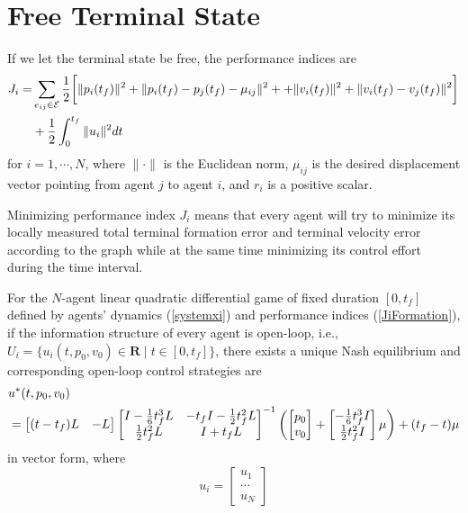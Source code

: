 \documentclass[12pt,draftcls,onecolumn]{IEEEtran}  %
\begin{document}
\section{Free Terminal State}
If we let the terminal state be free, the performance indices are
\begin{align}
J_i=&\sum_{e_{ij}\in\mathcal{E}} \frac{1}{2}\bigg[\|p_i(t_f)\|^2+\|p_i(t_f)-p_j(t_f)-\mu_{ij}\|^2+ +\|v_i(t_f)\|^2+\|v_i(t_f)-v_j(t_f)\|^2\bigg]\notag\\
&+\frac{1}{2}\int^{t_f}_0 \|u_i\|^2  \mbox{d}t\label{JiFormation}
\end{align}
for $i=1,\cdots,N$, where $\|\cdot\|$ is the Euclidean norm, $\mu_{ij}$ is the desired displacement vector pointing from {agent} $j$ to {agent} $i$, and $r_i$ is a positive scalar. {Minimizing performance index $J_i$ means that every agent will try to minimize its locally measured total terminal formation error and terminal velocity error according to the graph while at the same time minimizing its control effort during the time interval.
\begin{thm}
For the $N$-agent linear quadratic differential game of fixed duration $[0,t_f]$ defined by agents' dynamics (\ref{systemxi}) and performance indices (\ref{JiFormation}), if the information structure of every agent is open-loop, i.e., $U_i=\{u_i(t,p_0,v_0)\in \mathbf{R} \mid t\in[0,t_f]\}$, there exists a unique Nash equilibrium and corresponding open-loop control strategies are
\begin{align}
&u^*(t,p_0,v_0)\notag\\
&=
\begin{bmatrix}
(t-t_f)L&-L
\end{bmatrix}
\begin{bmatrix}
I-\frac{1}{6}t_f^3L&-t_fI-\frac{1}{2}t_f^2L\\
\frac{1}{2}t_f^2L&I+t_fL
\end{bmatrix}^{-1}\left(
\begin{bmatrix}
p_0\\
v_0
\end{bmatrix}+\begin{bmatrix}
-\frac{1}{6}t_f^3I\\ \frac{1}{2}t_f^2I
\end{bmatrix}\mu\right)
+
(t_f-t)\mu\label{uNash}
\end{align}
in vector form, where
\[u_i=\begin{bmatrix}
u_1 \\ \cdots \\ u_N

\end{bmatrix}\]
\end{thm}}
\end{document}
